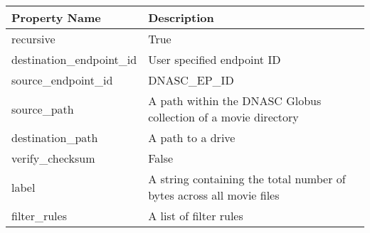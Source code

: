 \begin{tabular}{p{4cm}p{6cm}}
\toprule
 Property Name           & Description                                                          \\
\midrule
 recursive               & True                                                                 \\
 destination\_endpoint\_id & User specified endpoint ID                                           \\
 source\_endpoint\_id      & DNASC\_EP\_ID                                                          \\
 source\_path             & A path within the DNASC Globus collection of a movie directory       \\
 destination\_path        & A path to a drive                                                    \\
 verify\_checksum         & False                                                                \\
 label                   & A string containing the total number of bytes across all movie files \\
 filter\_rules            & A list of filter rules                                               \\
\bottomrule
\end{tabular}